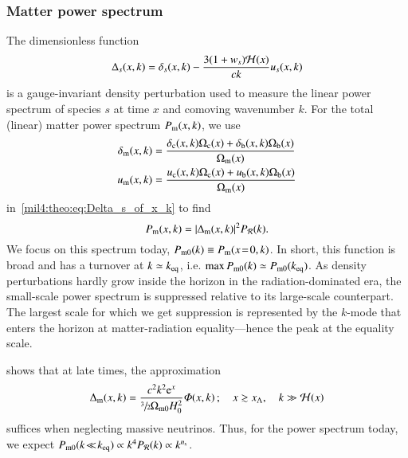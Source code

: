 \subsubsection{Matter power spectrum}
    The dimensionless function
    \begin{equation}\label{mil4:theo:eq:Delta_s_of_x_k}
        \Delta_s (x,k) = \delta_s(x,k) - \frac{3(1+w_s)\Hp(x)}{ck}u_s(x,k)
    \end{equation}
    is a gauge-invariant density perturbation used to measure the linear power spectrum of species $s$ at time $x$ and comoving wavenumber $k$. For the total (linear) matter power spectrum $P\ped{m}(x,k)$, we use
    \begin{equation}
    \begin{split}
        \delta\ped{m}(x,k) &= \frac{\delta\ped{c}(x,k) \Omega\ped{c}(x) + \delta\ped{b}(x,k) \Omega\ped{b}(x)}{\OmgM[](x)} \\
        u\ped{m}(x,k) &= \frac{u\ped{c}(x,k) \Omega\ped{c}(x) + u\ped{b}(x,k) \Omega\ped{b}(x)}{\OmgM[](x)}
    \end{split}
    \end{equation}
    in~\cref{mil4:theo:eq:Delta_s_of_x_k} to find
    \begin{equation}\label{mil4:theo:eq:matter_power_spectrum}
        P\ped{m}(x,k) = \abs{\Delta\ped{m}(x,k)}^2 P_\mathcal{R}(k).
    \end{equation}
    We focus on this spectrum today, $P\ped{m0}(k) \equiv P\ped{m}(x\!=\!0,k)$. In short, this function is broad and has a turnover at $k\simeq k\ped{eq}$, i.e. $\max{P\ped{m0}(k)} \simeq P\ped{m0}(k\ped{eq})$. As density perturbations hardly grow inside the horizon in the radiation-dominated era, the small-scale power spectrum is suppressed relative to its large-scale counterpart. The largest scale for which we get suppression is represented by the $k$-mode that enters the horizon at matter-radiation equality---hence the peak at the equality scale.

    \citet{DodelsonBook} shows that at late times, the approximation
    \begin{equation}\label{mil4:theo:eq:dimless_matter_power_spectrum}
        \Delta\ped{m}(x,k) = \frac{c^2k^2 \eu[x]}{\sfrac{3}{2} \OmgM H_0^2 } \Phi(x,k)\,; \quad x \gtrsim x\ped{\Lambda} ,\quad  k \gg \Hp(x)
    \end{equation}
    suffices when neglecting massive neutrinos. Thus, for the power spectrum today, we expect $P\ped{m0}(k\!\ll\!k\ped{eq}) \propto k^4P_\mathcal{R}(k) \propto k^{\ns}$. 

